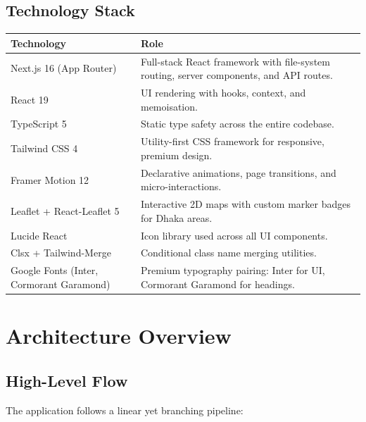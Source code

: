 \documentclass[12pt, a4paper, oneside]{report}
\begin{document}
\section{Technology Stack}

\begin{longtable}{p{4cm} p{9cm}}
\toprule
\textbf{Technology} & \textbf{Role} \\
\midrule
\endhead
Next.js 16 (App Router) & Full-stack React framework with file-system routing, server components, and API routes. \\
\midrule
React 19 & UI rendering with hooks, context, and memoisation. \\
\midrule
TypeScript 5 & Static type safety across the entire codebase. \\
\midrule
Tailwind CSS 4 & Utility-first CSS framework for responsive, premium design. \\
\midrule
Framer Motion 12 & Declarative animations, page transitions, and micro-interactions. \\
\midrule
Leaflet + React-Leaflet 5 & Interactive 2D maps with custom marker badges for Dhaka areas. \\
\midrule
Lucide React & Icon library used across all UI components. \\
\midrule
Clsx + Tailwind-Merge & Conditional class name merging utilities. \\
\midrule
Google Fonts (Inter, Cormorant Garamond) & Premium typography pairing: Inter for UI, Cormorant Garamond for headings. \\
\bottomrule
\end{longtable}


\chapter{Architecture Overview}

\section{High-Level Flow}

The application follows a linear yet branching pipeline:
\end{document}
